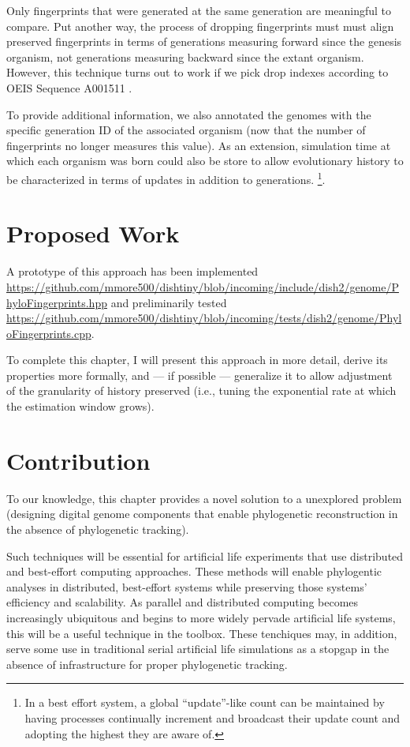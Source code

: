 Only fingerprints that were generated at the same generation are meaningful to compare.
Put another way, the process of dropping fingerprints must must align preserved fingerprints in terms of generations measuring forward since the genesis organism, not generations measuring backward since the extant organism.
However, this technique turns out to work if we pick drop indexes according to OEIS Sequence A001511 \cite{sloane2021a001511}.

To provide additional information, we also annotated the genomes with the specific generation ID of the associated organism (now that the number of fingerprints no longer measures this value).
As an extension, simulation time at which each organism was born could also be store to allow evolutionary history to be characterized in terms of updates in addition to generations.
\footnote{
In a best effort system, a global ``update''-like count can be maintained by having processes continually increment and broadcast their update count and adopting the highest they are aware of.
}.

\section{Proposed Work}

A prototype of this approach has been implemented \url{https://github.com/mmore500/dishtiny/blob/incoming/include/dish2/genome/PhyloFingerprints.hpp} and preliminarily tested \url{https://github.com/mmore500/dishtiny/blob/incoming/tests/dish2/genome/PhyloFingerprints.cpp}.

To complete this chapter, I will present this approach in more detail, derive its properties more formally, and --- if possible --- generalize it to allow adjustment of the granularity of history preserved (i.e., tuning the exponential rate at which the estimation window grows).

\section{Contribution}

To our knowledge, this chapter provides a novel solution to a unexplored problem (designing digital genome components that enable phylogenetic reconstruction in the absence of phylogenetic tracking).

Such techniques will be essential for artificial life experiments that use distributed and best-effort computing approaches.
These methods will enable phylogentic analyses in distributed, best-effort systems while preserving those systems' efficiency and scalability.
As parallel and distributed computing becomes increasingly ubiquitous and begins to more widely pervade artificial life systems, this will be a useful technique in the toolbox.
These tenchiques may, in addition, serve some use in traditional serial artificial life simulations as a stopgap in the absence of infrastructure for proper phylogenetic tracking.

